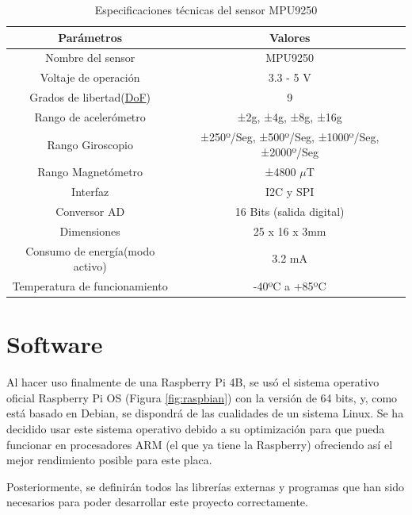 \begin{table}[H]
\begin{center}
\begin{tabular}{|c|c|}
\hline
\textbf{Parámetros} & \textbf{Valores} \\
\hline

Nombre del sensor & MPU9250 \\
Voltaje de operación & 3.3 - 5 V \\  
Grados de libertad(\hyperlink{DoF}{DoF}) & 9 \\   
Rango de acelerómetro & ±2g, ±4g, ±8g, ±16g \\   
Rango Giroscopio & ±250º/Seg, ±500º/Seg, ±1000º/Seg, ±2000º/Seg \\
Rango Magnetómetro & ±4800 $ \mu $T \\  
Interfaz & I2C y SPI \\   
Conversor AD & 16 Bits (salida digital) \\   
Dimensiones & 25 x 16 x 3mm \\
Consumo de energía(modo activo) & 3.2 mA \\
Temperatura de funcionamiento & -40ºC a +85ºC \\ 


\hline
\end{tabular}
\caption{Especificaciones técnicas del sensor MPU9250}
\label{cuadro:ejemplo}
\end{center}
\end{table}

\section{Software}
\label{sec:software}


Al hacer uso finalmente de una Raspberry Pi 4B, se usó el sistema operativo oficial Raspberry Pi OS (Figura \ref{fig:raspbian}) con la versión de 64 bits, y, como está basado en Debian, se dispondrá de las cualidades de un sistema Linux. Se ha decidido usar este sistema operativo debido a su optimización para que pueda funcionar en procesadores ARM (el que ya tiene la Raspberry) ofreciendo así el mejor rendimiento posible para este placa.


Posteriormente, se definirán todos las librerías externas y programas que han sido necesarios para poder desarrollar este proyecto correctamente.

